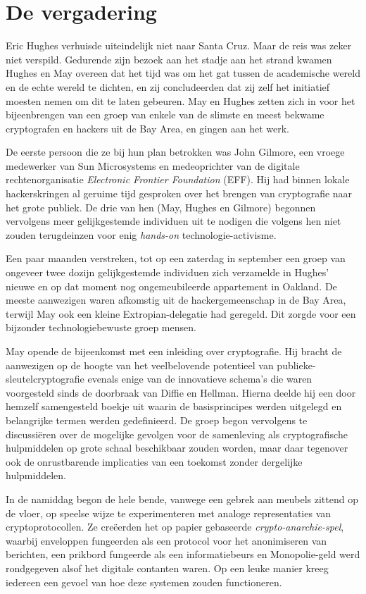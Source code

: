 \documentclass[
  a5paper,
  smalldemyvopaper,11pt,twoside,onecolumn,openright,extrafontsizes,
hidelinks]{memoir}
\begin{document}
\section{De vergadering}\label{de-vergadering}

Eric Hughes verhuisde uiteindelijk niet naar Santa Cruz. Maar de reis
was zeker niet verspild. Gedurende zijn bezoek aan het stadje aan het
strand kwamen Hughes en May overeen dat het tijd was om het gat tussen
de academische wereld en de echte wereld te dichten, en zij
concludeerden dat zij zelf het initiatief moesten nemen om dit te laten
gebeuren. May en Hughes zetten zich in voor het bijeenbrengen van een
groep van enkele van de slimste en meest bekwame cryptografen en hackers
uit de Bay Area, en gingen aan het werk.

De eerste persoon die ze bij hun plan betrokken was John Gilmore, een
vroege medewerker van Sun Microsystems en medeoprichter van de digitale
rechtenorganisatie \emph{Electronic Frontier Foundation} (EFF). Hij had
binnen lokale hackerskringen al geruime tijd gesproken over het brengen
van cryptografie naar het grote publiek. De drie van hen (May, Hughes en
Gilmore) begonnen vervolgens meer gelijkgestemde individuen uit te
nodigen die volgens hen niet zouden terugdeinzen voor enig
\emph{hands-on} technologie-activisme.

Een paar maanden verstreken, tot op een zaterdag in september een groep
van ongeveer twee dozijn gelijkgestemde individuen zich verzamelde in
Hughes' nieuwe en op dat moment nog ongemeubileerde appartement in
Oakland. De meeste aanwezigen waren afkomstig uit de hackergemeenschap
in de Bay Area, terwijl May ook een kleine Extropian-delegatie had
geregeld. Dit zorgde voor een bijzonder technologiebewuste groep mensen.

May opende de bijeenkomst met een inleiding over cryptografie. Hij
bracht de aanwezigen op de hoogte van het veelbelovende potentieel van
publieke-sleutelcryptografie evenals enige van de innovatieve schema's
die waren voorgesteld sinds de doorbraak van Diffie en Hellman. Hierna
deelde hij een door hemzelf samengesteld boekje uit waarin de
basisprincipes werden uitgelegd en belangrijke termen werden
gedefinieerd. De groep begon vervolgens te discussiëren over de
mogelijke gevolgen voor de samenleving als cryptografische hulpmiddelen
op grote schaal beschikbaar zouden worden, maar daar tegenover ook de
onrustbarende implicaties van een toekomst zonder dergelijke
hulpmiddelen.

In de namiddag begon de hele bende, vanwege een gebrek aan meubels
zittend op de vloer, op speelse wijze te experimenteren met analoge
representaties van cryptoprotocollen. Ze creëerden het op papier
gebaseerde \emph{crypto-anarchie-spel}, waarbij enveloppen fungeerden
als een protocol voor het anonimiseren van berichten, een prikbord
fungeerde als een informatiebeurs en Monopolie-geld werd rondgegeven
alsof het digitale contanten waren. Op een leuke manier kreeg iedereen
een gevoel van hoe deze systemen zouden functioneren.
\end{document}

